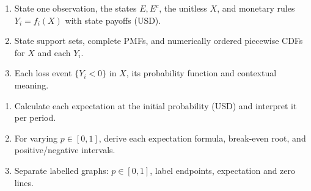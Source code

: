 \noindent\begin{minipage}[t]{.49\linewidth}\vspace{0pt}
\begin{enumerate}[label=\arabic*.,itemsep=2pt,topsep=2pt,leftmargin=1.5em]
\item State one observation, the states $E,E^c$, the unitless $X$, and monetary rules $Y_i=f_i(X)$ with state payoffs (USD).
\item State support sets, complete PMFs, and numerically ordered piecewise CDFs for $X$ and each $Y_i$.
\item Each loss event $\{Y_i<0\}$ in $X$, its probability function and contextual meaning.
\end{enumerate}
\end{minipage}\hfill
\begin{minipage}[t]{.49\linewidth}\vspace{0pt}
\begin{enumerate}[label=\arabic*.,itemsep=2pt,topsep=2pt,leftmargin=1.5em]
\item Calculate each expectation at the initial probability (USD) and interpret it per period.
\item For varying $p\in[0,1]$, derive each expectation formula, break-even root, and positive/negative intervals.
\item Separate labelled graphs: $p\in[0,1]$, label endpoints, expectation and zero lines.
\end{enumerate}
\end{minipage}\par


